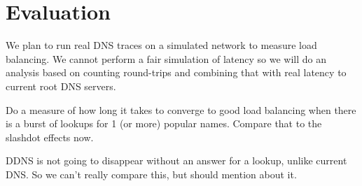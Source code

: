 \section{Evaluation}

We plan to run real DNS traces on a simulated network to
measure load balancing.  
We cannot perform a fair simulation of latency so we will do an
analysis based on counting round-trips and combining that
with real latency to current root DNS servers.

Do a measure of how long it takes to converge to good load 
balancing when there is a burst of lookups for 1 (or more)
popular names. Compare that to the slashdot effects now.

DDNS is not going to disappear without an answer for a lookup,
unlike current DNS. So we can't really compare this, but should
mention about it.

